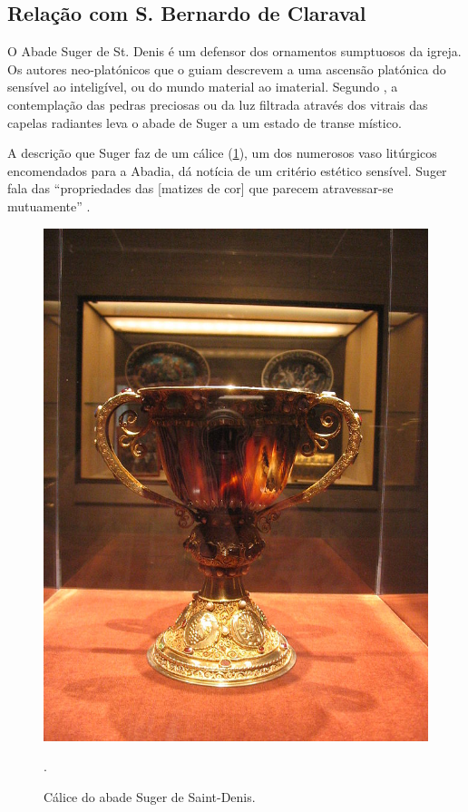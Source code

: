 \documentclass{article}
\begin{document}
\subsection{Relação com S. Bernardo de Claraval}

O Abade Suger de St. Denis é um defensor dos ornamentos sumptuosos da
igreja. Os autores neo-platónicos que o guiam descrevem a uma ascensão
platónica do sensível ao inteligível, ou do mundo material ao
imaterial. Segundo \cite{panofsky-suger}, a contemplação das pedras
preciosas ou da luz filtrada através dos vitrais das capelas
radiantes leva o abade de Suger a um estado de transe místico.

A descrição que Suger faz de um cálice (\ref{fig:3}), um dos numerosos
vaso litúrgicos encomendados para a Abadia, dá notícia de um critério
estético sensível. Suger fala das ``propriedades das [matizes de cor]
que parecem atravessar-se mutuamente'' \cite{jago-suger}.

\begin{figure}
\centering\includegraphics[height=0.6\textheight,keepaspectratio]
                          {images/suger-calice.jpg}
  \caption{Cálice do abade Suger de Saint-Denis.}.
  \label{fig:3}
\end{figure}
\end{document}
